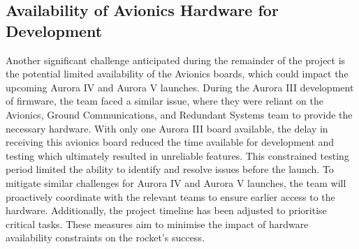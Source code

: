 \subsection{Availability of Avionics Hardware for Development}
Another significant challenge anticipated during the remainder of the project is the potential limited availability of the Avionics boards, which could impact the upcoming Aurora IV and Aurora V launches. During the Aurora III development of firmware, the team faced a similar issue, where they were reliant on the Avionics, Ground Communications, and Redundant Systems team to provide the necessary hardware. With only one Aurora III board available, the delay in receiving this avionics board reduced the time available for development and testing which ultimately resulted in unreliable features. This constrained testing period limited the ability to identify and resolve issues before the launch. To mitigate similar challenges for Aurora IV and Aurora V launches, the team will proactively coordinate with the relevant teams to ensure earlier access to the hardware. Additionally, the project timeline has been adjusted to prioritise critical tasks. These measures aim to minimise the impact of hardware availability constraints on the rocket's success. 

